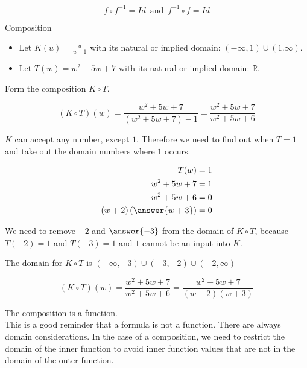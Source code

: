 \documentclass{ximera}
\begin{document}
\[   f \circ f^{-1} = Id    \, \text{ and } \, f^{-1} \circ f = Id       \]










\begin{example} Composition


\begin{itemize}
\item Let $K(u) = \frac{u}{u-1}$ with its natural or implied domain: $(-\infty, 1) \cup (1. \infty)$. \\

\item Let $T(w) = w^2 + 5w + 7$ with its natural or implied domain: \textbf{$\mathbb{R}$}.
\end{itemize}


Form the composition $K \circ T$.

\[        (K \circ T)(w) =     \frac{w^2 + 5w + 7}{(w^2 + 5w + 7)-1}   =    \frac{w^2 + 5w + 7}{w^2 + 5w + 6}  \]


$K$ can accept any number, except $1$.  Therefore we need to find out when $T = 1$ and take out the domain numbers where $1$ occurs.



\begin{align*}
T(w) & = 1   \\
w^2 + 5w + 7 & = 1 \\
w^2 + 5w + 6 & = 0   \\
(w+2)\left( \answer{w+3} \right) & = 0
\end{align*}


We need to remove $-2$ and $\answer{-3}$ from the domain of $K \circ T$, because $T(-2)=1$ and $T(-3)=1$ and $1$ cannot be an input into $K$.


The domain for $K \circ T$ is $(-\infty, -3) \cup (-3, -2) \cup (-2, \infty)$




\[        (K \circ T)(w)  =    \frac{w^2 + 5w + 7}{w^2 + 5w + 6}  =    \frac{w^2 + 5w + 7}{(w+2)(w+3)} \]










The composition is a function. \\


This is a good reminder that a formula is not a function. There are always domain considerations.  In the case of a composition, we need to restrict the domain of the inner function to avoid inner function values that are not in the domain of the outer function.










\end{example}
\end{document}
